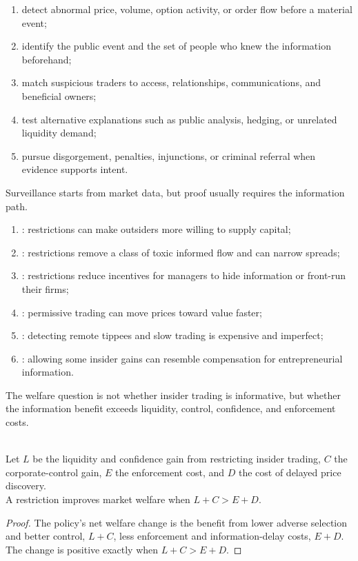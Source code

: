 \documentclass[a4paper,oneside,openany]{book}
\begin{document}
\begin{process} 
\begin{enumerate}[label=\roman*.]
\setlength{\itemsep}{0pt}
\item detect abnormal price, volume, option activity, or order flow before a material event;
\item identify the public event and the set of people who knew the information beforehand;
\item match suspicious traders to access, relationships, communications, and beneficial owners;
\item test alternative explanations such as public analysis, hedging, or unrelated liquidity demand;
\item pursue disgorgement, penalties, injunctions, or criminal referral when evidence supports intent.
\end{enumerate}
Surveillance starts from market data, but proof usually requires the information path.
\end{process}

\begin{taxonomy} 
\begin{enumerate}[label=\roman*.]
\setlength{\itemsep}{0pt}
\item {}: restrictions can make outsiders more willing to supply capital;
\item {}: restrictions remove a class of toxic informed flow and can narrow spreads;
\item {}: restrictions reduce incentives for managers to hide information or front-run their firms;
\item {}: permissive trading can move prices toward value faster;
\item {}: detecting remote tippees and slow trading is expensive and imperfect;
\item {}: allowing some insider gains can resemble compensation for entrepreneurial information.
\end{enumerate}
The welfare question is not whether insider trading is informative, but whether the information benefit exceeds liquidity, control, confidence, and enforcement costs.
\end{taxonomy}

\begin{proposition} \\
Let $L$ be the liquidity and confidence gain from restricting insider trading, $C$ the corporate-control gain, $E$ the enforcement cost, and $D$ the cost of delayed price discovery.\\
A restriction improves market welfare when $L+C>E+D$.
\begin{proof}
The policy's net welfare change is the benefit from lower adverse selection and better control, $L+C$, less enforcement and information-delay costs, $E+D$.\\
The change is positive exactly when $L+C>E+D$.
\end{proof}
\end{proposition}
\end{document}
